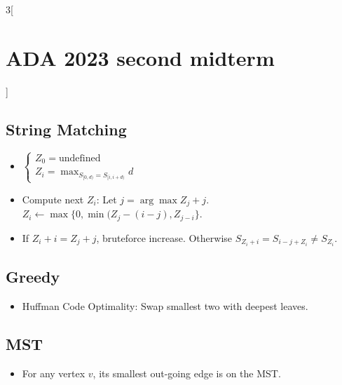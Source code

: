 \documentclass[10pt,a4paper]{report}
\begin{document}
\begin{multicols}{3}[\section*{ADA 2023 second midterm}]
\subsection*{String Matching}
\begin{itemize} 
  \item $\begin{cases} Z_0 = \text{undefined} \\ Z_i = \displaystyle\max_{S_{[0, d)} = S_{[i, i + d)}} d \end{cases}$
  \item Compute next $Z_i$: Let $j = \arg\max Z_j + j$. $Z_i \leftarrow \max \{0, \min(Z_j - (i - j), Z_{j - i}\}$.
  \item If $Z_i + i = Z_j + j$, bruteforce increase. Otherwise $S_{Z_i + i} = S_{i - j + Z_i} \neq S_{Z_i}$.
\end{itemize}

\subsection*{Greedy}
\begin{itemize} 
  \item Huffman Code Optimality: Swap smallest two with deepest leaves.
\end{itemize}

\subsection*{MST}
\begin{itemize} 
  \item For any vertex $v$, its smallest out-going edge is on the MST.
\end{itemize}


\end{multicols}
\end{document}
